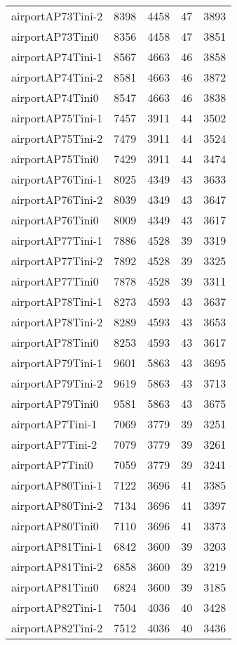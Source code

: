 \begin{longtable}{lrrrr}
airportAP73Tini-2 & 8398 & 4458 & 47 & 3893 \\
airportAP73Tini0 & 8356 & 4458 & 47 & 3851 \\
airportAP74Tini-1 & 8567 & 4663 & 46 & 3858 \\
airportAP74Tini-2 & 8581 & 4663 & 46 & 3872 \\
airportAP74Tini0 & 8547 & 4663 & 46 & 3838 \\
airportAP75Tini-1 & 7457 & 3911 & 44 & 3502 \\
airportAP75Tini-2 & 7479 & 3911 & 44 & 3524 \\
airportAP75Tini0 & 7429 & 3911 & 44 & 3474 \\
airportAP76Tini-1 & 8025 & 4349 & 43 & 3633 \\
airportAP76Tini-2 & 8039 & 4349 & 43 & 3647 \\
airportAP76Tini0 & 8009 & 4349 & 43 & 3617 \\
airportAP77Tini-1 & 7886 & 4528 & 39 & 3319 \\
airportAP77Tini-2 & 7892 & 4528 & 39 & 3325 \\
airportAP77Tini0 & 7878 & 4528 & 39 & 3311 \\
airportAP78Tini-1 & 8273 & 4593 & 43 & 3637 \\
airportAP78Tini-2 & 8289 & 4593 & 43 & 3653 \\
airportAP78Tini0 & 8253 & 4593 & 43 & 3617 \\
airportAP79Tini-1 & 9601 & 5863 & 43 & 3695 \\
airportAP79Tini-2 & 9619 & 5863 & 43 & 3713 \\
airportAP79Tini0 & 9581 & 5863 & 43 & 3675 \\
airportAP7Tini-1 & 7069 & 3779 & 39 & 3251 \\
airportAP7Tini-2 & 7079 & 3779 & 39 & 3261 \\
airportAP7Tini0 & 7059 & 3779 & 39 & 3241 \\
airportAP80Tini-1 & 7122 & 3696 & 41 & 3385 \\
airportAP80Tini-2 & 7134 & 3696 & 41 & 3397 \\
airportAP80Tini0 & 7110 & 3696 & 41 & 3373 \\
airportAP81Tini-1 & 6842 & 3600 & 39 & 3203 \\
airportAP81Tini-2 & 6858 & 3600 & 39 & 3219 \\
airportAP81Tini0 & 6824 & 3600 & 39 & 3185 \\
airportAP82Tini-1 & 7504 & 4036 & 40 & 3428 \\
airportAP82Tini-2 & 7512 & 4036 & 40 & 3436 \\

\end{longtable}
